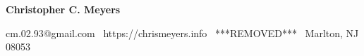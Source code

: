 
\begin{center}
{\LARGE \textbf{Christopher C. Meyers}}
\end{center}
\begin{center}
cm.02.93@gmail.com \textbullet \  https://chrismeyers.info \textbullet \ ***REMOVED*** \textbullet \ Marlton, NJ 08053
\end{center}
